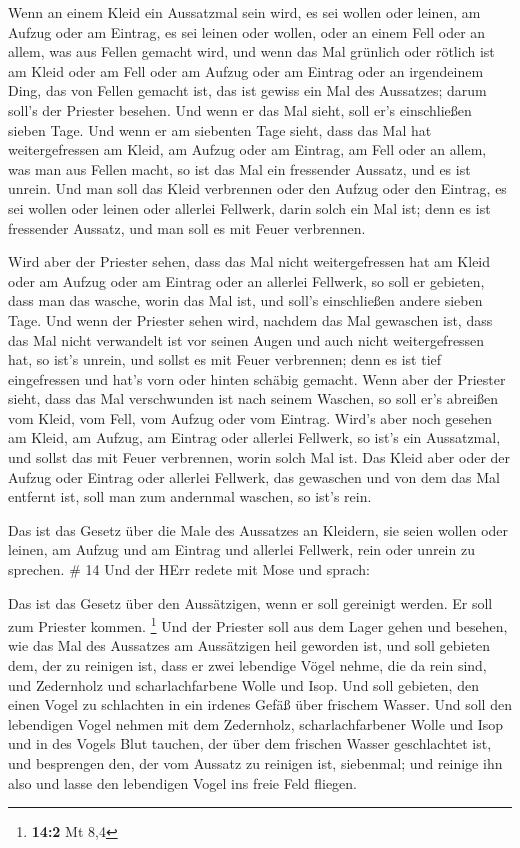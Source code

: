  Wenn an einem Kleid ein Aussatzmal sein wird, es sei
wollen oder leinen,  am Aufzug oder am Eintrag, es sei
leinen oder wollen, oder an einem Fell oder an allem, was aus Fellen
gemacht wird,  und wenn das Mal grünlich oder rötlich ist
am Kleid oder am Fell oder am Aufzug oder am Eintrag oder an irgendeinem
Ding, das von Fellen gemacht ist, das ist gewiss ein Mal des Aussatzes;
darum soll's der Priester besehen.  Und wenn er das Mal
sieht, soll er's einschließen sieben Tage.  Und wenn er am
siebenten Tage sieht, dass das Mal hat weitergefressen am Kleid, am
Aufzug oder am Eintrag, am Fell oder an allem, was man aus Fellen macht,
so ist das Mal ein fressender Aussatz, und es ist unrein. 
Und man soll das Kleid verbrennen oder den Aufzug oder den Eintrag, es
sei wollen oder leinen oder allerlei Fellwerk, darin solch ein Mal ist;
denn es ist fressender Aussatz, und man soll es mit Feuer verbrennen.

 Wird aber der Priester sehen, dass das Mal nicht
weitergefressen hat am Kleid oder am Aufzug oder am Eintrag oder an
allerlei Fellwerk,  so soll er gebieten, dass man das
wasche, worin das Mal ist, und soll's einschließen andere sieben Tage.
 Und wenn der Priester sehen wird, nachdem das Mal
gewaschen ist, dass das Mal nicht verwandelt ist vor seinen Augen und
auch nicht weitergefressen hat, so ist's unrein, und sollst es mit Feuer
verbrennen; denn es ist tief eingefressen und hat's vorn oder hinten
schäbig gemacht.  Wenn aber der Priester sieht, dass das
Mal verschwunden ist nach seinem Waschen, so soll er's abreißen vom
Kleid, vom Fell, vom Aufzug oder vom Eintrag.  Wird's aber
noch gesehen am Kleid, am Aufzug, am Eintrag oder allerlei Fellwerk, so
ist's ein Aussatzmal, und sollst das mit Feuer verbrennen, worin solch
Mal ist.  Das Kleid aber oder der Aufzug oder Eintrag oder
allerlei Fellwerk, das gewaschen und von dem das Mal entfernt ist, soll
man zum andernmal waschen, so ist's rein.

 Das ist das Gesetz über die Male des Aussatzes an
Kleidern, sie seien wollen oder leinen, am Aufzug und am Eintrag und
allerlei Fellwerk, rein oder unrein zu sprechen. \# 14  Und
der HErr redete mit Mose und sprach:

 Das ist das Gesetz über den Aussätzigen, wenn er soll
gereinigt werden. Er soll zum Priester kommen. \footnote{\textbf{14:2}
  Mt 8,4}  Und der Priester soll aus dem Lager gehen und
besehen, wie das Mal des Aussatzes am Aussätzigen heil geworden ist,
 und soll gebieten dem, der zu reinigen ist, dass er zwei
lebendige Vögel nehme, die da rein sind, und Zedernholz und
scharlachfarbene Wolle und Isop.  Und soll gebieten, den
einen Vogel zu schlachten in ein irdenes Gefäß über frischem Wasser.
 Und soll den lebendigen Vogel nehmen mit dem Zedernholz,
scharlachfarbener Wolle und Isop und in des Vogels Blut tauchen, der
über dem frischen Wasser geschlachtet ist,  und besprengen
den, der vom Aussatz zu reinigen ist, siebenmal; und reinige ihn also
und lasse den lebendigen Vogel ins freie Feld fliegen.

